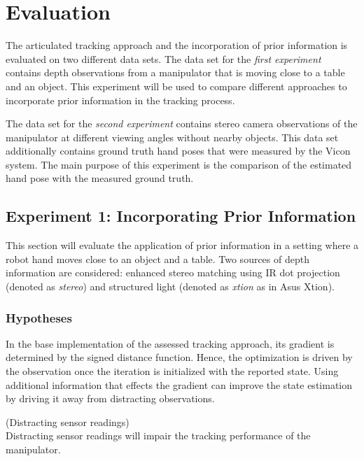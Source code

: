 \chapter{Evaluation}
\label{sec:evaluation}

The articulated tracking approach and the incorporation of prior information is evaluated on two different data sets. The data set for the \textit{first experiment} contains depth observations from a manipulator that is moving close to a table and an object. This experiment will be used to compare different approaches to incorporate prior information in the tracking process.

The data set for the \textit{second experiment} contains stereo camera observations of the manipulator at different viewing angles without nearby objects. This data set additionally contains ground truth hand poses that were measured by the Vicon system. The main purpose of this experiment is the comparison of the estimated hand pose with the measured ground truth.

\section{Experiment 1: Incorporating Prior Information}

This section will evaluate the application of prior information in a setting where a robot hand moves close to an object and a table. Two sources of depth information are considered: enhanced stereo matching using IR dot projection (denoted as \emph{stereo}) and structured light (denoted as \emph{xtion} as in Asus Xtion).

\subsection{Hypotheses}

In the base implementation of the assessed tracking approach, its gradient is determined by the signed distance function. Hence, the optimization is driven by the observation once the iteration is initialized with the reported state. Using additional information that effects the gradient can improve the state estimation by driving it away from distracting observations.

\begin{hypothesis}(Distracting sensor readings)\\
Distracting sensor readings will impair the tracking performance of the manipulator.
\label{hyp:distracting_readings}
\end{hypothesis}

